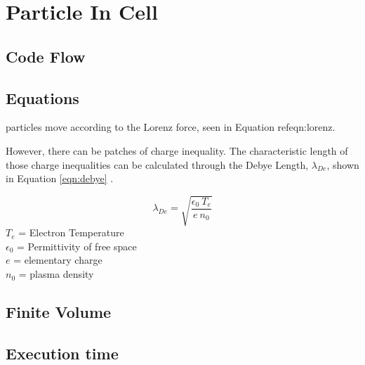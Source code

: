 \section{Particle In Cell}
\subsection{Code Flow}
\subsection{Equations}

particles move according to the Lorenz force, seen in Equation ref{eqn:lorenz}.




However, there can be patches of charge inequality. The characteristic length of those charge inequalities can be calculated through the Debye Length, \(\lambda_{De}\), shown in Equation \ref{eqn:debye} \cite{debye}. \par


\begin{equation}
    \label{eqn:debye}
    \lambda_{De} = \sqrt{\frac{\epsilon_0 \: T_e}{e \: n_0}}
\end{equation}
\(T_e\) = Electron Temperature \\
\(\epsilon_0\) = Permittivity of free space \\
\(e\) = elementary charge \\
\(n_0\) = plasma density \par

\subsection{Finite Volume}
\subsection{Execution time}
